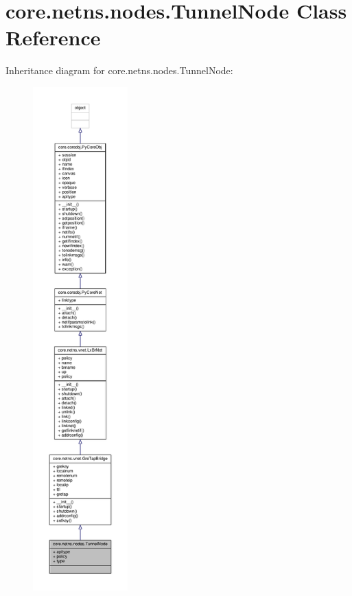 \hypertarget{classcore_1_1netns_1_1nodes_1_1_tunnel_node}{\section{core.\+netns.\+nodes.\+Tunnel\+Node Class Reference}
\label{classcore_1_1netns_1_1nodes_1_1_tunnel_node}
}


Inheritance diagram for core.\+netns.\+nodes.\+Tunnel\+Node\+:
\nopagebreak
\begin{figure}[H]
\begin{center}
\leavevmode
\includegraphics[height=550pt]{classcore_1_1netns_1_1nodes_1_1_tunnel_node__inherit__graph}
\end{center}
\end{figure}


